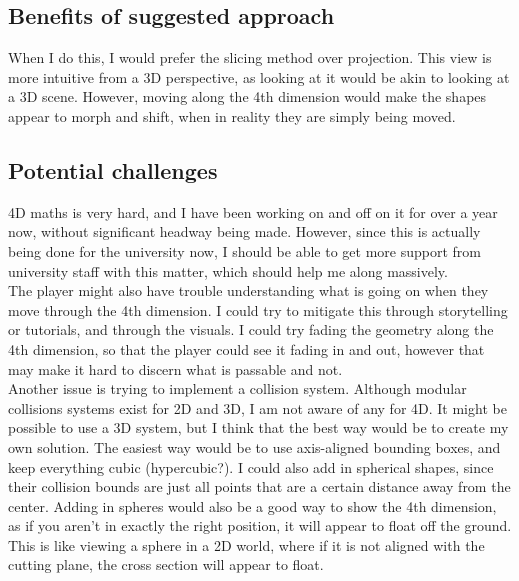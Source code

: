 \documentclass[12pt]{article}
\begin{document}
\subsection{Benefits of suggested approach}
When I do this, I would prefer the slicing method over projection. 
This view is more intuitive from a 3D perspective, as looking at it would be akin to looking at a 3D scene. 
However, moving along the 4th dimension would make the shapes appear to morph and shift, when in reality they are simply being moved.

\subsection{Potential challenges}
4D maths is very hard, and I have been working on and off on it for over a year now, without significant headway being made. 
However, since this is actually being done for the university now, I should be able to get more support from university staff with this matter, which should help me along massively.\\
The player might also have trouble understanding what is going on when they move through the 4th dimension. I could try to mitigate this through storytelling or tutorials, and through the visuals.
I could try fading the geometry along the 4th dimension, so that the player could see it fading in and out, however that may make it hard to discern what is passable and not.\\
Another issue is trying to implement a collision system. Although modular collisions systems exist for 2D and 3D, I am not aware of any for 4D. It might be possible to use a 3D system, but I think that the best way would be to create my own solution.
The easiest way would be to use axis-aligned bounding boxes, and keep everything cubic (hypercubic?).
I could also add in spherical shapes, since their collision bounds are just all points that are a certain distance away from the center.
Adding in spheres would also be a good way to show the 4th dimension, as if you aren't in exactly the right position, it will appear to float off the ground.
This is like viewing a sphere in a 2D world, where if it is not aligned with the cutting plane, the cross section will appear to float.
\end{document}
